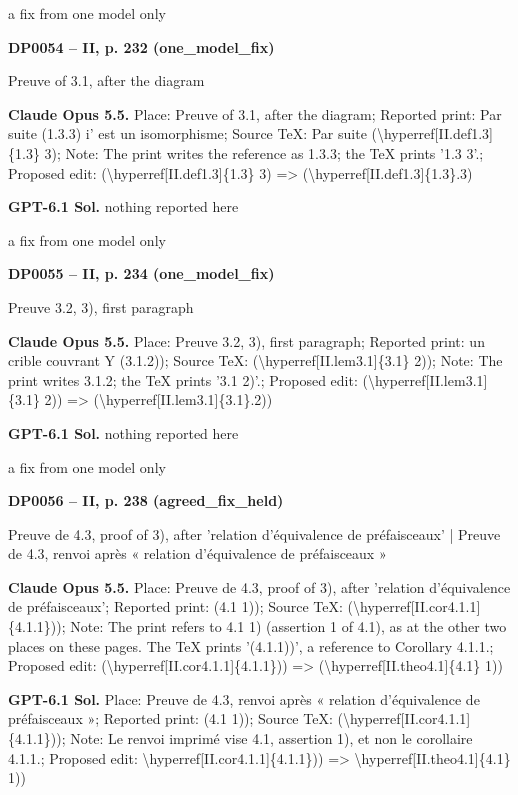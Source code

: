 a fix from one model only\par
\par\noindent\hypertarget{DP0054}{}\textbf{DP0054 -- II, p. 232 (one\_model\_fix)}\par
Preuve of 3.1, after the diagram\par
\textbf{Claude Opus 5.5.} Place: Preuve of 3.1, after the diagram; Reported print: Par suite (1.3.3) i' est un isomorphisme; Source TeX: Par suite (\textbackslash{}hyperref[II.def1.3]\{1.3\} 3); Note: The print writes the reference as 1.3.3; the TeX prints '1.3 3'.; Proposed edit: (\textbackslash{}hyperref[II.def1.3]\{1.3\} 3) =\allowbreak > (\textbackslash{}hyperref[II.def1.3]\{1.3\}.3)\par
\textbf{GPT-6.1 Sol.} nothing reported here\par
a fix from one model only\par
\par\noindent\hypertarget{DP0055}{}\textbf{DP0055 -- II, p. 234 (one\_model\_fix)}\par
Preuve 3.2, 3), first paragraph\par
\textbf{Claude Opus 5.5.} Place: Preuve 3.2, 3), first paragraph; Reported print: un crible couvrant Y (3.1.2)); Source TeX: (\textbackslash{}hyperref[II.lem3.1]\{3.1\} 2)); Note: The print writes 3.1.2; the TeX prints '3.1 2)'.; Proposed edit: (\textbackslash{}hyperref[II.lem3.1]\{3.1\} 2)) =\allowbreak > (\textbackslash{}hyperref[II.lem3.1]\{3.1\}.2))\par
\textbf{GPT-6.1 Sol.} nothing reported here\par
a fix from one model only\par
\par\noindent\hypertarget{DP0056}{}\textbf{DP0056 -- II, p. 238 (agreed\_fix\_held)}\par
Preuve de 4.3, proof of 3), after 'relation d'équivalence de préfaisceaux' | Preuve de 4.3, renvoi après « relation d'équivalence de préfaisceaux »\par
\textbf{Claude Opus 5.5.} Place: Preuve de 4.3, proof of 3), after 'relation d'équivalence de préfaisceaux'; Reported print: (4.1 1)); Source TeX: (\textbackslash{}hyperref[II.cor4.1.1]\{4.1.1\})); Note: The print refers to 4.1 1) (assertion 1 of 4.1), as at the other two places on these pages. The TeX prints '(4.1.1))', a reference to Corollary 4.1.1.; Proposed edit: (\textbackslash{}hyperref[II.cor4.1.1]\{4.1.1\})) =\allowbreak > (\textbackslash{}hyperref[II.theo4.1]\{4.1\} 1))\par
\textbf{GPT-6.1 Sol.} Place: Preuve de 4.3, renvoi après « relation d'équivalence de préfaisceaux »; Reported print: (4.1 1)); Source TeX: (\textbackslash{}hyperref[II.cor4.1.1]\{4.1.1\})); Note: Le renvoi imprimé vise 4.1, assertion 1), et non le corollaire 4.1.1.; Proposed edit: \textbackslash{}hyperref[II.cor4.1.1]\{4.1.1\})) =\allowbreak > \textbackslash{}hyperref[II.theo4.1]\{4.1\} 1))\par
